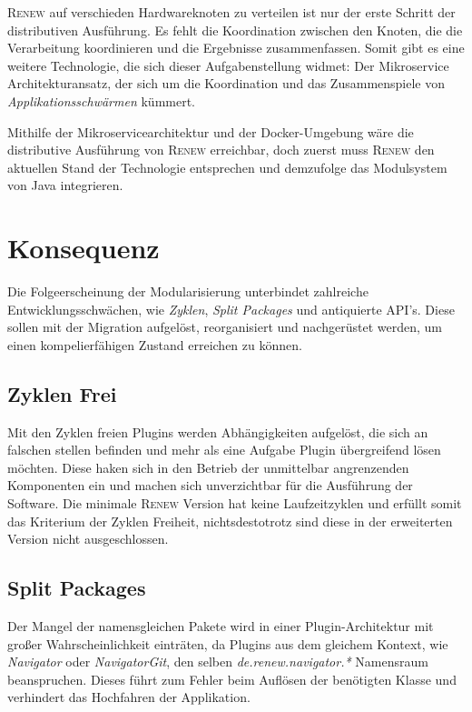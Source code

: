 	\textsc{Renew} auf verschieden Hardwareknoten zu verteilen ist nur der erste Schritt der distributiven Ausführung. Es fehlt die Koordination zwischen den Knoten, die die Verarbeitung koordinieren und die Ergebnisse zusammenfassen. Somit gibt es eine weitere Technologie, die sich dieser Aufgabenstellung widmet: Der Mikroservice Architekturansatz, der sich um die Koordination und das Zusammenspiele von \textit{Applikationsschwärmen} kümmert. \bigbreak

	Mithilfe der Mikroservicearchitektur und der Docker-Umgebung wäre die distributive Ausführung von \textsc{Renew} erreichbar, doch zuerst muss \textsc{Renew} den aktuellen Stand der Technologie entsprechen und demzufolge das Modulsystem von Java integrieren.  


\section{Konsequenz} \label{auswirkung}
	Die Folgeerscheinung der Modularisierung unterbindet zahlreiche Entwicklungsschwächen, wie \textit{Zyklen}, \textit{Split Packages} und antiquierte API's. Diese sollen mit der Migration aufgelöst, reorganisiert und nachgerüstet werden, um einen kompelierfähigen Zustand erreichen zu können.

\subsection{Zyklen Frei} 
	Mit den Zyklen freien Plugins werden Abhängigkeiten aufgelöst, die sich an falschen stellen befinden und mehr als eine Aufgabe Plugin übergreifend lösen möchten. Diese haken sich in den Betrieb der unmittelbar angrenzenden Komponenten ein und machen sich unverzichtbar für die Ausführung der Software. Die minimale \textsc{Renew} Version hat keine Laufzeitzyklen und erfüllt somit das Kriterium der Zyklen Freiheit, nichtsdestotrotz sind diese in der erweiterten Version nicht ausgeschlossen.

\subsection{Split Packages}
	Der Mangel der namensgleichen Pakete wird in einer Plugin-Architektur mit großer Wahrscheinlichkeit einträten, da Plugins aus dem gleichem Kontext, wie \textit{Navigator} oder \textit{NavigatorGit}, den selben \textit{de.renew.navigator.*} Namensraum beanspruchen. Dieses führt zum Fehler beim Auflösen der benötigten Klasse und verhindert das Hochfahren der Applikation. 

